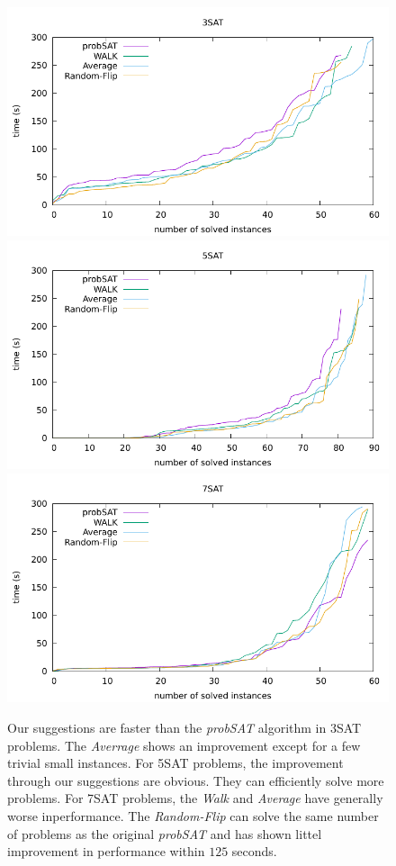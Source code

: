 \documentclass[12pt,a4paper,twoside]{scrartcl}
\numberwithin{equation}{section}
\begin{document}
\begin{figure}[H]
\begin{center}
  \includegraphics[scale = 1]{DATA/K3/e2.pdf}
    \includegraphics[scale = 1]{DATA/K5/e2.pdf}
      \includegraphics[scale = 1]{DATA/K7/e2.pdf}

  \end{center}
  \caption{Our suggestions are faster than the \emph{probSAT} algorithm in 3SAT problems. The \emph{Averrage} shows an improvement except for a few trivial small instances. For 5SAT problems, the improvement through our suggestions are obvious. They can efficiently solve more problems. For 7SAT problems, the \emph{Walk} and \emph{Average} have generally worse inperformance. The \emph{Random-Flip} can solve the same number of problems as the original \emph{probSAT} and has shown littel improvement in performance within $125$ seconds.}

  \label{Experiment 2 cactus plot}
  \end{figure}
\clearpage
\end{document}
